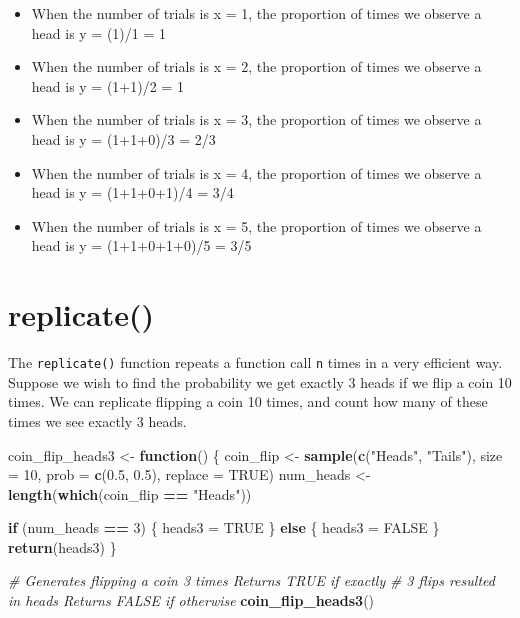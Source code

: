 \documentclass[
]{book}
\newenvironment{Shaded}{\begin{snugshade}}{\end{snugshade}}
\newcommand{\CommentTok}[1]{\textcolor[rgb]{0.56,0.35,0.01}{\textit{#1}}}
\newcommand{\ControlFlowTok}[1]{\textcolor[rgb]{0.13,0.29,0.53}{\textbf{#1}}}
\newcommand{\DataTypeTok}[1]{\textcolor[rgb]{0.13,0.29,0.53}{#1}}
\newcommand{\DecValTok}[1]{\textcolor[rgb]{0.00,0.00,0.81}{#1}}
\newcommand{\FloatTok}[1]{\textcolor[rgb]{0.00,0.00,0.81}{#1}}
\newcommand{\KeywordTok}[1]{\textcolor[rgb]{0.13,0.29,0.53}{\textbf{#1}}}
\newcommand{\NormalTok}[1]{#1}
\newcommand{\OperatorTok}[1]{\textcolor[rgb]{0.81,0.36,0.00}{\textbf{#1}}}
\newcommand{\OtherTok}[1]{\textcolor[rgb]{0.56,0.35,0.01}{#1}}
\newcommand{\StringTok}[1]{\textcolor[rgb]{0.31,0.60,0.02}{#1}}
\providecommand{\tightlist}{%
  \setlength{\itemsep}{0pt}\setlength{\parskip}{0pt}}
\begin{document}
\begin{itemize}
\tightlist
\item
  When the number of trials is x = 1, the proportion of times we observe a head is y = (1)/1 = 1
\item
  When the number of trials is x = 2, the proportion of times we observe a head is y = (1+1)/2 = 1
\item
  When the number of trials is x = 3, the proportion of times we observe a head is y = (1+1+0)/3 = 2/3
\item
  When the number of trials is x = 4, the proportion of times we observe a head is y = (1+1+0+1)/4 = 3/4
\item
  When the number of trials is x = 5, the proportion of times we observe a head is y = (1+1+0+1+0)/5 = 3/5
\end{itemize}

\hypertarget{replicate-1}{%
\section{replicate()}\label{replicate-1}}

The \texttt{replicate()} function repeats a function call \texttt{n} times in a very efficient way. Suppose we wish to find the probability we get exactly 3 heads if we flip a coin 10 times. We can replicate flipping a coin 10 times, and count how many of these times we see exactly 3 heads.

\begin{Shaded}
\begin{Highlighting}[]
\NormalTok{coin_flip_heads3 <-}\StringTok{ }\ControlFlowTok{function}\NormalTok{() \{}
\NormalTok{    coin_flip <-}\StringTok{ }\KeywordTok{sample}\NormalTok{(}\KeywordTok{c}\NormalTok{(}\StringTok{"Heads"}\NormalTok{, }\StringTok{"Tails"}\NormalTok{), }\DataTypeTok{size =} \DecValTok{10}\NormalTok{, }\DataTypeTok{prob =} \KeywordTok{c}\NormalTok{(}\FloatTok{0.5}\NormalTok{,}
        \FloatTok{0.5}\NormalTok{), }\DataTypeTok{replace =} \OtherTok{TRUE}\NormalTok{)}
\NormalTok{    num_heads <-}\StringTok{ }\KeywordTok{length}\NormalTok{(}\KeywordTok{which}\NormalTok{(coin_flip }\OperatorTok{==}\StringTok{ "Heads"}\NormalTok{))}

    \ControlFlowTok{if}\NormalTok{ (num_heads }\OperatorTok{==}\StringTok{ }\DecValTok{3}\NormalTok{) \{}
\NormalTok{        heads3 =}\StringTok{ }\OtherTok{TRUE}
\NormalTok{    \} }\ControlFlowTok{else}\NormalTok{ \{}
\NormalTok{        heads3 =}\StringTok{ }\OtherTok{FALSE}
\NormalTok{    \}}
    \KeywordTok{return}\NormalTok{(heads3)}
\NormalTok{\}}



\CommentTok{# Generates flipping a coin 3 times Returns TRUE if exactly}
\CommentTok{# 3 flips resulted in heads Returns FALSE if otherwise}
\KeywordTok{coin_flip_heads3}\NormalTok{()}
\end{Highlighting}
\end{Shaded}
\end{document}
